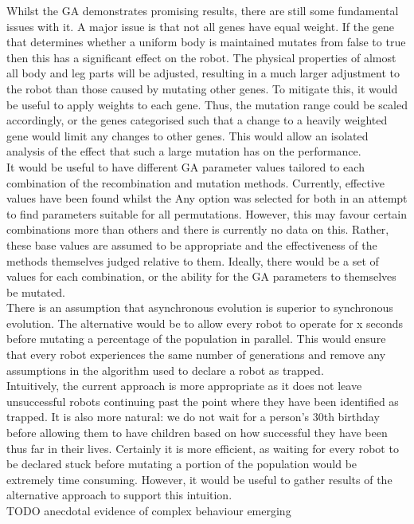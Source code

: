 \documentclass{article}
\begin{document}
Whilst the GA demonstrates promising results, there are still some fundamental issues with it. A major issue is that not all genes have equal weight. If the gene that determines whether a uniform body is maintained mutates from false to true then this has a significant effect on the robot. The physical properties of almost all body and leg parts will be adjusted, resulting in a much larger adjustment to the robot than those caused by mutating other genes. To mitigate this, it would be useful to apply weights to each gene. Thus, the mutation range could be scaled accordingly, or the genes categorised such that a change to a heavily weighted gene would limit any changes to other genes. This would allow an isolated analysis of the effect that such a large mutation has on the performance.\\
It would be useful to have different GA parameter values tailored to each combination of the recombination and mutation methods. Currently, effective values have been found whilst the Any option was selected for both in an attempt to find parameters suitable for all permutations. However, this may favour certain combinations more than others and there is currently no data on this. Rather, these base values are assumed to be appropriate and the effectiveness of the methods themselves judged relative to them. Ideally, there would be a set of values for each combination, or the ability for the GA parameters to themselves be mutated. \\
There is an assumption that asynchronous evolution is superior to synchronous evolution. The alternative would be to allow every robot to operate for x seconds before mutating a percentage of the population in parallel. This would ensure that every robot experiences the same number of generations and remove any assumptions in the algorithm used to declare a robot as trapped. \\
Intuitively, the current approach is more appropriate as it does not leave unsuccessful robots continuing past the point where they have been identified as trapped. It is also more natural: we do not wait for a person’s 30th birthday before allowing them to have children based on how successful they have been thus far in their lives. Certainly it is more efficient, as waiting for every robot to be declared stuck before mutating a portion of the population would be extremely time consuming. However, it would be useful to gather results of the alternative approach to support this intuition. \\
TODO anecdotal evidence of complex behaviour emerging\\
\end{document}
